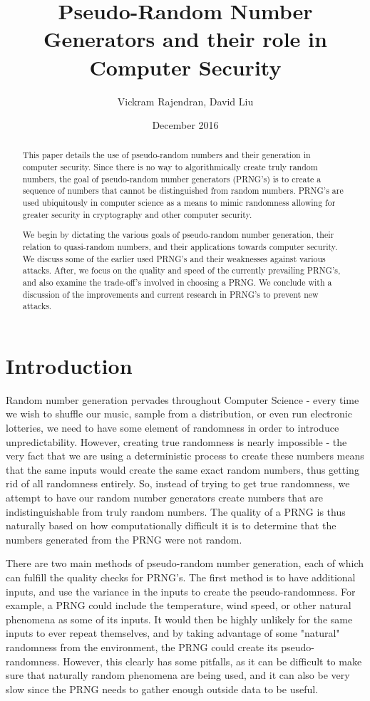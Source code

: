 \documentclass[11pt]{article}
\title{Pseudo-Random Number Generators and their role in Computer Security}
\author{Vickram Rajendran, David Liu}
\date{December 2016}
\begin{document}
\maketitle


\begin{abstract}
This paper details the use of pseudo-random numbers and their generation in computer security. Since there is no way to algorithmically create truly random numbers, the goal of pseudo-random number generators (PRNG's) is to create a sequence of numbers that cannot be distinguished from random numbers. PRNG's are used ubiquitously in computer science as a means to mimic randomness allowing for greater security in cryptography and other computer security.

We begin by dictating the various goals of pseudo-random number generation, their relation to quasi-random numbers, and their applications towards computer security. We discuss some of the earlier used PRNG's and their weaknesses against various attacks. After, we focus on the quality and speed of the currently prevailing PRNG's, and also examine the trade-off's involved in choosing a PRNG. We conclude with a discussion of the improvements and current research in PRNG's to prevent new attacks. 
\end{abstract}


\section{Introduction}

Random number generation pervades throughout Computer Science - every time we wish to shuffle our music, sample from a distribution, or even run electronic lotteries, we need to have some element of randomness in order to introduce unpredictability. However, creating true randomness is nearly impossible - the very fact that we are using a deterministic process to create these numbers means that the same inputs would create the same exact random numbers, thus getting rid of all randomness entirely. So, instead of trying to get true randomness, we attempt to have our random number generators create numbers that are indistinguishable from truly random numbers. The quality of a PRNG is thus naturally based on how computationally difficult it is to determine that the numbers generated from the PRNG were not random. 

There are two main methods of pseudo-random number generation, each of which can fulfill the quality checks for PRNG's. The first method is to have additional inputs, and use the variance in the inputs to create the pseudo-randomness. For example, a PRNG could include the temperature, wind speed, or other natural phenomena as some of its inputs. It would then be highly unlikely for the same inputs to ever repeat themselves, and by taking advantage of some "natural" randomness from the environment, the PRNG could create its pseudo-randomness. However, this clearly has some pitfalls, as it can be difficult to make sure that naturally random phenomena are being used, and it can also be very slow since the PRNG needs to gather enough outside data to be useful. 
\end{document}
